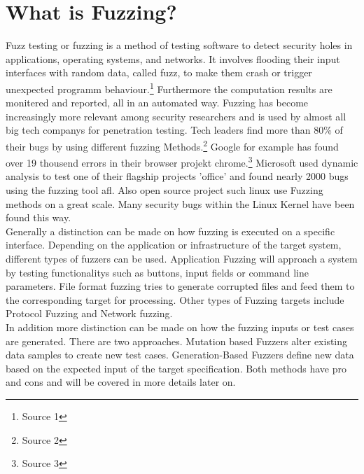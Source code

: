 \documentclass[journal=tosc,final]{iacrtrans}
\begin{document}
\section{What is Fuzzing?}
Fuzz testing or fuzzing is a method of testing software to detect security holes in applications, operating systems, and networks. It involves flooding their input interfaces with random data, called fuzz, to make them crash or trigger unexpected programm behaviour.\footnote{Source 1} Furthermore the computation results are monitered and reported, all in an automated way. Fuzzing has become increasingly more relevant among security researchers and is used by almost all big tech companys for penetration testing. Tech leaders find more than 80\% of their bugs by using different fuzzing Methods.\footnote{Source 2} Google for example  has found over 19 thousend errors in their browser projekt chrome.\footnote{Source 3} Microsoft used dynamic analysis to test one of their flagship projects 'office' and found nearly 2000 bugs using the fuzzing tool afl. Also open source project such linux use Fuzzing methods on a great scale. Many security bugs within the Linux Kernel have been found this way.\\
Generally a distinction can be made on how fuzzing is executed on a specific interface. Depending on the application or infrastructure of the target system, different types of fuzzers can be used. Application Fuzzing will approach a system by testing functionalitys such as buttons, input fields or command line parameters. File format fuzzing tries to generate corrupted files and feed them to the corresponding target for processing. Other types of Fuzzing targets include Protocol Fuzzing and Network fuzzing.\\
In addition more distinction can be made on how the fuzzing inputs or test cases are generated. There are two approaches. Mutation based Fuzzers alter existing data samples to create new test cases. Generation-Based Fuzzers define new data based on the expected input of the target specification. Both methods have pro and cons and will be covered in more details later on.
\newpage
\end{document}
